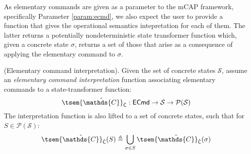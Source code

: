 As elementary commands are given as a parameter to the mCAP framework, specifically Parameter \ref{param:ecmd}, we also expect the user to provide a function that gives the operational semantics intepretation for each of them. The latter returns a potentially nondeterministic state transformer function which, given a concrete state $\sigma$, returns a set of those that arise as a consequence of applying the elementary command to $\sigma$.
\begin{param}
	\label{param:ecmdInt}
	(Elementary command interpretation).
	Given the set of concrete states $\mathcal{S}$, assume an \emph{elementary command interpretation} function associating elementary commands to a state-transformer function:
	\[
		\tsem{\hat{\mathds{C}}}_{\hat{\mathsf{C}}} : \mathsf{ECmd} \rightarrow \mathcal{S} \rightarrow \mathcal{P}(\mathcal{S})
	\]
	The interpretation function is also lifted to a set of concrete states, such that for $S \in \mathcal{P}(\mathcal{S})$:
	\[
		\tsem{\hat{\mathds{C}}}_{\hat{\mathsf{C}}}(S) \triangleq \bigcup_{\sigma \in S} \tsem{\hat{\mathds{C}}}_{\hat{\mathsf{C}}}(\sigma)
	\]
\end{param}

